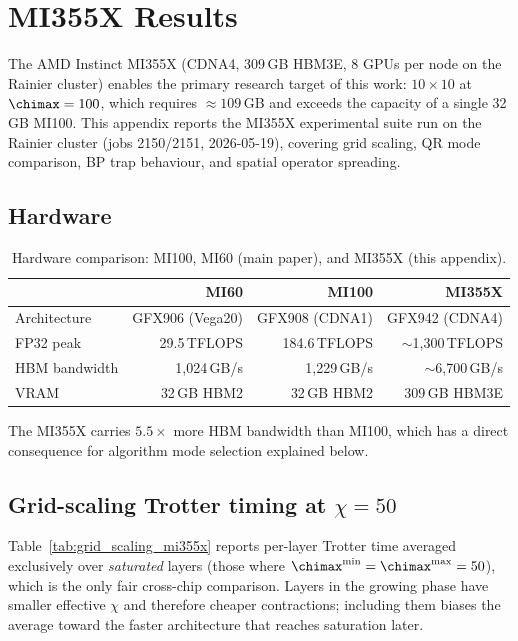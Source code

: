 \section{MI355X Results}
\label{app:mi355x}

The AMD Instinct MI355X (CDNA4, 309\,GB HBM3E, 8 GPUs per node on the Rainier
cluster) enables the primary research target of this work: $10\times10$ at
$\chimax=100$, which requires $\approx 109$\,GB and exceeds the capacity of a
single 32\,GB MI100.
This appendix reports the MI355X experimental suite run on the Rainier cluster
(jobs 2150/2151, 2026-05-19), covering grid scaling, QR mode comparison, BP
trap behaviour, and spatial operator spreading.

\subsection*{Hardware}

\begin{table}[ht]
\centering
\caption{Hardware comparison: MI100, MI60 (main paper), and MI355X (this appendix).}
\label{tab:hardware_mi355x}
\small
\begin{tabular}{lrrr}
\toprule
                  & MI60              & MI100             & MI355X \\
\midrule
Architecture      & GFX906 (Vega20)   & GFX908 (CDNA1)    & GFX942 (CDNA4) \\
FP32 peak         & 29.5\,TFLOPS      & 184.6\,TFLOPS     & $\sim$1{,}300\,TFLOPS \\
HBM bandwidth     & 1{,}024\,GB/s     & 1{,}229\,GB/s     & $\sim$6{,}700\,GB/s \\
VRAM              & 32\,GB HBM2       & 32\,GB HBM2       & 309\,GB HBM3E \\
\bottomrule
\end{tabular}
\end{table}

The MI355X carries $\mathbf{5.5\times}$ more HBM bandwidth than MI100, which
has a direct consequence for algorithm mode selection explained below.

\subsection*{Grid-scaling Trotter timing at $\chi = 50$}

Table~\ref{tab:grid_scaling_mi355x} reports per-layer Trotter time averaged
exclusively over \emph{saturated} layers (those where $\chimax^{\min} =
\chimax^{\max} = 50$), which is the only fair cross-chip comparison.
Layers in the growing phase have smaller effective $\chi$ and therefore cheaper
contractions; including them biases the average toward the faster architecture
that reaches saturation later.

